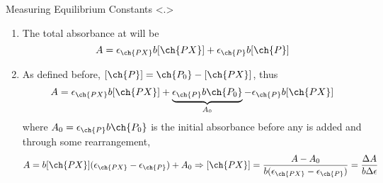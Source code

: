 \documentclass[notes=show]{beamer}
\begin{document}
\begin{frame}[t]{Measuring Equilibrium Constants}
\note<.>{%
	\begin{enumerate}
		\item The total absorbance at \textlambda{} will be
			\begin{equation*}
				A = \epsilon_{\ch{PX}}b[\ch{PX}] +
				\epsilon_{\ch{P}}b[\ch{P}]
			\end{equation*}
		\item As defined before, $[\ch{P}] = \ch{P_0} - [\ch{PX}]$, thus
			\begin{equation*}
				A = \epsilon_{\ch{PX}}b[\ch{PX}] +
				\underbrace{\epsilon_{\ch{P}}b\ch{P_0}}_{A_0} -
				\epsilon_{\ch{P}}b[\ch{PX}]
			\end{equation*}
			where $A_0 = \epsilon_{\ch{P}}b\ch{P_0}$ is the initial
			absorbance before any  is added and through some
			rearrangement,
			\begin{equation*}
				A = b[\ch{PX}](\epsilon_{\ch{PX}} -
				\epsilon_{\ch{P}}) + A_0 \Rightarrow
				[\ch{PX}] = \frac{A - A_0}{b(\epsilon_{\ch{PX}}
				- \epsilon_{\ch{P}})} = \frac{\Delta A}{b \Delta
				\epsilon}
			\end{equation*}
	\end{enumerate}
}
\end{frame}

\end{document}
